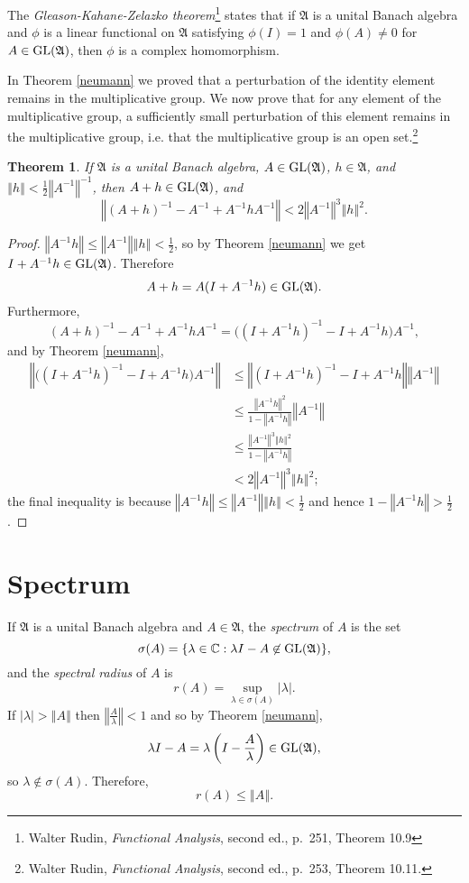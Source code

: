 \documentclass{article}
\newcommand{\GL}{\ensuremath\mathrm{GL}}
\newcommand{\norm}[1]{\left\Vert #1 \right\Vert}
\newtheorem{theorem}{Theorem}
\theoremstyle{definition}
\begin{document}
  
 The {\em Gleason-Kahane-Zelazko theorem}\footnote{Walter Rudin, {\em Functional Analysis}, second ed., p.~251, Theorem 10.9}
 states that if $\mathfrak{A}$ is a unital Banach algebra and $\phi$ is a linear functional on $\mathfrak{A}$ satisfying
 $\phi(I)=1$ and $\phi(A) \neq 0$ for $A \in \GL(\mathfrak{A})$, then $\phi$ is a complex homomorphism.

 
 

 
 In Theorem \ref{neumann} we proved that a  perturbation of the identity element remains in the multiplicative group. We
 now prove that for any element of the multiplicative group, a sufficiently small perturbation of this element remains in the multiplicative
 group, i.e. that the multiplicative group is an open set.\footnote{Walter Rudin, {\em Functional Analysis}, second ed., p.~253, Theorem 10.11.} 
 
 \begin{theorem}
 If $\mathfrak{A}$ is a unital Banach algebra, $A \in \GL(\mathfrak{A})$, $h \in \mathfrak{A}$, and $\norm{h}<\frac{1}{2} \norm{A^{-1}}^{-1}$,
 then $A+h \in \GL(\mathfrak{A})$, and
 \[
 \norm{(A+h)^{-1}-A^{-1}+A^{-1}hA^{-1}} < 2 \norm{A^{-1}}^3 \norm{h}^2.
 \]
 \label{GLA}
 \end{theorem}
 \begin{proof}
 $\norm{A^{-1}h} \leq \norm{A^{-1}} \norm{h} < \frac{1}{2}$, so by Theorem \ref{neumann} we get $I+A^{-1}h \in \GL(\mathfrak{A})$. Therefore
\[
A+h = A(I+A^{-1}h) \in \GL(\mathfrak{A}).
\]
Furthermore,
\[
(A+h)^{-1}-A^{-1}+A^{-1}hA^{-1} = \big((I+A^{-1}h)^{-1}-I+A^{-1}h\big)A^{-1},
\]
and  by Theorem \ref{neumann},
\begin{align*}
\norm{\big((I+A^{-1}h)^{-1}-I+A^{-1}h\big)A^{-1}} &\leq \norm{(I+A^{-1}h)^{-1}-I+A^{-1}h} \norm{A^{-1}}\\
&\leq \frac{\norm{A^{-1}h}^2}{1-\norm{A^{-1}h}} \norm{A^{-1}}\\
&\leq \frac{\norm{A^{-1}}^3 \norm{h}^2}{1-\norm{A^{-1}h}}\\
&< 2 \norm{A^{-1}}^3 \norm{h}^2;
\end{align*}
the final inequality is because $\norm{A^{-1}h} \leq \norm{A^{-1}}\norm{h} < \frac{1}{2}$ and hence 
$1-\norm{A^{-1}h} > \frac{1}{2}$.
 \end{proof}



 
 
 \section{Spectrum}
 If $\mathfrak{A}$ is a unital Banach algebra and $A \in \mathfrak{A}$, the {\em spectrum} of $A$ is the set
 \[
 \sigma(A) = \{\lambda \in \mathbb{C}: \lambda I -A\not \in \GL(\mathfrak{A})\},
 \]
 and the {\em spectral radius} of $A$ is
 \[
 r(A)=\sup_{\lambda \in \sigma(A)} |\lambda|.
 \]
 If $|\lambda| > \norm{A}$ then  $\norm{\frac{A}{\lambda}}<1$ and so by Theorem \ref{neumann},
 \[
 \lambda I-A = \lambda\left(I-\frac{A}{\lambda}\right) \in \GL(\mathfrak{A}),
 \]
 so $\lambda \not \in \sigma(A)$. Therefore, 
 \[
 r(A) \leq \norm{A}.
 \]
 
\end{document}
